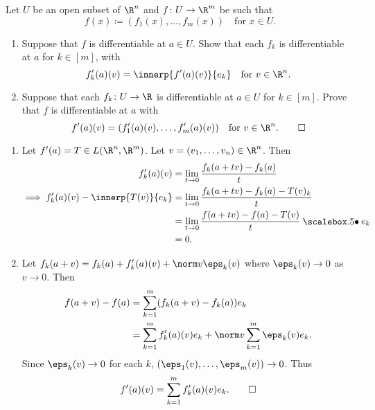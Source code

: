 \documentclass[12pt]{article}
\begin{document}
\begin{problem}
    Let $U$ be an open subset of $\R^n$ and $f\colon U \to \R^m$ be such
    that \[
        f(x) \coloneq (f_1(x), \dots, f_m(x)) \quad \text{for } x \in U.
    \]
    \begin{enumerate}
        \item Suppose that $f$ is differentiable at $a \in U$.
        Show that each $f_k$ is differentiable at $a$ for $k \in [m]$,
        with \[
            f_k'(a)(v) = \innerp{f'(a)(v)}{e_k}
            \quad \text{for } v \in \R^n.
        \]
        \item Suppose that each $f_k\colon U \to \R$ is differentiable at
        $a \in U$ for $k \in [m]$.
        Prove that $f$ is differentiable at $a$ with \[
            f'(a)(v) = (f_1'(a)(v), \dots, f_m'(a)(v))
            \quad \text{for } v \in \R^n. \qedhere
        \]
    \end{enumerate}
\end{problem}
\begin{solution} \leavevmode
    \begin{enumerate}
        \item Let $f'(a) = T \in L(\R^n, \R^m)$.
        Let $v = (v_1, \dots, v_n) \in \R^n$.
        Then \begin{align*}
            f_k'(a)(v) &= \lim_{t \to 0} \frac{f_k(a + tv) - f_k(a)}{t} \\
            \implies f_k'(a)(v) - \innerp{T(v)}{e_k} &= \lim_{t \to 0}
            \frac{f_k(a + tv) - f_k(a) - T(v)_k}{t} \\
            &= \lim_{t \to 0} \frac{f(a + tv) - f(a) - T(v)}{t} \dotp e_k \\
            &= 0.
        \end{align*}
        \item Let $f_k(a + v) = f_k(a) + f_k'(a)(v) + \norm v \eps_k(v)$
        where $\eps_k(v) \to 0$ as $v \to 0$.
        Then \begin{align*}
            f(a + v) - f(a) &= \sum_{k = 1}^m (f_k(a + v) - f_k(a)) e_k \\
                &= \sum_{k=1}^m f_k'(a)(v) e_k + \norm v \sum_{k=1}^m
                    \eps_k(v) e_k.
        \end{align*}
        Since $\eps_k(v) \to 0$ for each $k$,
        $(\eps_1(v), \dots, \eps_m(v)) \to 0$.
        Thus \[
            f'(a)(v) = \sum_{k=1}^m f_k'(a)(v) e_k. \qedhere
        \]
    \end{enumerate}
\end{solution}
\end{document}
